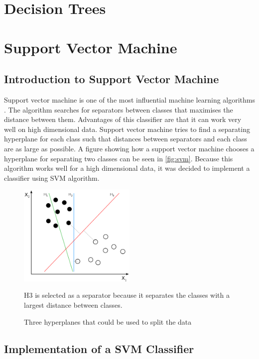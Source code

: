 \section{Decision Trees}

\fi

\section{Support Vector Machine}

\subsection{Introduction to Support Vector Machine}

Support vector machine is one of the most influential machine learning algorithms \cite{boser1992training}. The algorithm searches for separators between classes that maximises the distance between them. Advantages of this classifier are that it can work very well on high dimensional data. Support vector machine tries to find a separating hyperplane for each class such that distances between separators and each class are as large as possible. A figure showing how a support vector machine chooses a hyperplane for separating two classes can be seen in \autoref{fig:svm}. Because this algorithm works well for a high dimensional data, it was decided to implement a classifier using SVM algorithm.

\begin{figure}[h]
\centering
\includegraphics[width=0.5\textwidth]{Figures/svm.PNG}
\caption{Three hyperplanes  that could be used to split the data  }
H3 is selected as a separator because it separates the classes with a largest distance between classes.
\citep{wikipedia_svm}
\label{fig:svm}
\end{figure}


\subsection{Implementation of a SVM Classifier}

